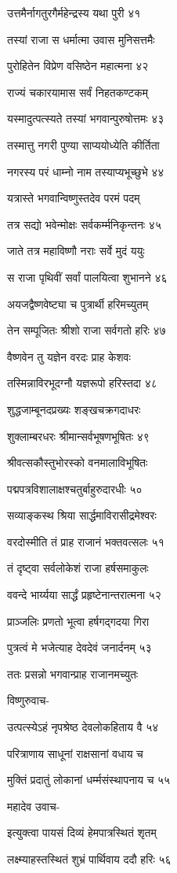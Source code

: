 उत्तमैर्नागतुरगैर्महेन्द्रस्य यथा पुरी ४१

तस्यां राजा स धर्मात्मा उवास मुनिसत्तमैः

पुरोहितेन विप्रेण वसिष्ठेन महात्मना ४२

राज्यं चकारयामास सर्वं निहतकण्टकम्

यस्मादुत्पत्स्यते तस्यां भगवान्पुरुषोत्तमः ४३

तस्मात्तु नगरी पुण्या साप्ययोध्येति कीर्तिता

नगरस्य परं धाम्नो नाम तस्याप्यभूच्छुभे ४४

यत्रास्ते भगवान्विष्णुस्तदेव परमं पदम्

तत्र सद्यो भवेन्मोक्षः सर्वकर्म्मनिकृन्तनः ४५

जाते तत्र महाविष्णौ नराः सर्वे मुदं ययुः

स राजा पृथिवीं सर्वां पालयित्वा शुभानने ४६

अयजद्वैष्णवेष्ट्या च पुत्रार्थी हरिमच्युतम्

तेन सम्पूजितः श्रीशो राजा सर्वगतो हरिः ४७

वैष्णवेन तु यज्ञेन वरदः प्राह केशवः

तस्मिन्नाविरभूदग्नौ यज्ञरूपो हरिस्तदा ४८

शुद्धजाम्बूनदप्रख्यः शङ्खचक्रगदाधरः

शुक्लाम्बरधरः श्रीमान्सर्वभूषणभूषितः ४९

श्रीवत्सकौस्तुभोरस्को वनमालाविभूषितः

पद्मपत्रविशालाक्षश्चतुर्बाहुरुदारधीः ५०

सव्याङ्कस्थ श्रिया सार्द्धमाविरासीद्रमेश्वरः

वरदोस्मीति तं प्राह राजानं भक्तवत्सलः ५१

तं दृष्ट्वा सर्वलोकेशं राजा हर्षसमाकुलः

ववन्दे भार्य्यया सार्द्धं प्रहृष्टेनान्तरात्मना ५२

प्राञ्जलिः प्रणतो भूत्वा हर्षगद्गदया गिरा

पुत्रत्वं मे भजेत्याह देवदेवं जनार्दनम् ५३

ततः प्रसन्नो भगवान्प्राह राजानमच्युतः

विष्णुरुवाच-

उत्पत्स्येऽहं नृपश्रेष्ठ देवलोकहिताय वै ५४

परित्राणाय साधूनां राक्षसानां वधाय च

मुक्तिं प्रदातुं लोकानां धर्म्मसंस्थापनाय च ५५

महादेव उवाच-

इत्युक्त्वा पायसं दिव्यं हेमपात्रस्थितं शृतम्

लक्ष्म्याहस्तस्थितं शुभ्रं पार्थिवाय ददौ हरिः ५६

